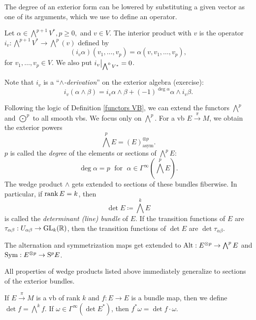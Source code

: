 The degree of an exterior form can be lowered by substituting a given vector as one of its arguments, which we use to define an operator.

\begin{defn}
    Let $\alpha\in\bigwedge^{p+1}V^\ast, p\geq 0,$ and $v\in V$. The interior product with $v$ is the operator $i_v:\bigwedge^{p+1}V^\ast\to \bigwedge^p(v)$ defined by 
    \[(i_v \alpha)(v_1,\ldots,v_p)=\alpha(v,v_1,\ldots,v_p),\]
    for $v_1,\ldots,v_p\in V$. We also put $\restr{i_v}{\bigwedge^0V^\ast}=0$.
\end{defn}

Note that $i_v$ is a ``\emph{$\wedge$-derivation}'' on the exterior algebra (exercise):
\[i_v(\alpha\wedge\beta)=i_v\alpha\wedge\beta+(-1)^{\deg \alpha}\alpha\wedge i_v\beta.\label{eq interior product derivation}\]


\begin{defn}
Following the logic of Definition \ref{functors VB}, we can extend the functors $\bigwedge^p$ and $\bigodot^p$ to all smooth \glspl{vb}. We focus only on $\bigwedge^p$. For a \gls{vb} $E\overset{\pi}{\to} M$, we obtain the exterior powers
\[\bigwedge^p E=(E)^{\otimes p}_{\text{asym}}.\]
$p$ is called the \emph{degree} of the elements or sections of $\bigwedge^p E$: \[\deg \alpha=p\;\text{ for }\;\alpha\in\Gamma^\infty\left(\bigwedge^p E\right).\]
The wedge product $\wedge$ gets extended to sections of these bundles fiberwise.
In particular, if $\operatorname{rank} E=k$, then \[\det E\coloneqq \bigwedge^k E\] is called the \emph{determinant (line) bundle} of $E$. If the transition functions of $E$ are $\tau_{\alpha\beta}:U_{\alpha\beta}\to \operatorname{GL}_k(\mathbb{R} )$, then the transition functions of $\det E$ are $\det \tau_{\alpha\beta}$.

The alternation and symmetrization maps get extended to $\operatorname{Alt}: E^{\otimes p}\to \bigwedge^p E$ and $\operatorname{Sym}: E^{\otimes p}\to \mathrm{S}^p E$.
\end{defn}

All properties of wedge products listed above immediately generalize to sections of the exterior bundles.

\begin{defn}
If $E\overset\pi\to M$ is a \gls{vb} of rank $k$ and $f:E\to E$ is a bundle map, then we define $\det f=\bigwedge^k f$. If $\omega\in\Gamma^\infty(\det E^\ast)$, then $f^\ast \omega=\det f\cdot \omega$.
\end{defn}

